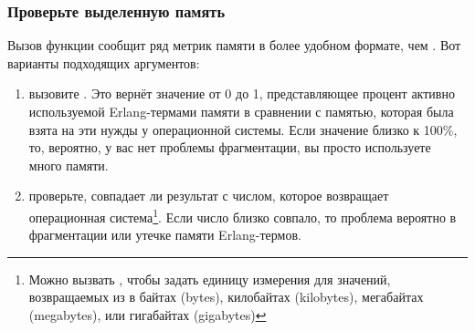 \subsubsection{Проверьте выделенную память}

Вызов функции  сообщит ряд метрик памяти в более удобном формате, чем . Вот варианты подходящих аргументов:

\begin{enumerate}
	\item вызовите . Это вернёт значение от 0 до 1, представляющее процент активно используемой Erlang-термами памяти в сравнении с памятью, которая была взята на эти нужды у операционной системы. Если значение близко к 100\%, то, вероятно, у вас нет проблемы фрагментации, вы просто используете много памяти.
	\item проверьте, совпадает ли результат  с числом, которое возвращает операционная система\footnote{Можно вызвать , чтобы задать единицу измерения для значений, возвращаемых из  в байтах (bytes), килобайтах (kilobytes), мегабайтах (megabytes), или гигабайтах (gigabytes)}. Если число близко совпало, то проблема вероятно в фрагментации или утечке памяти Erlang-термов.
\end{enumerate}

